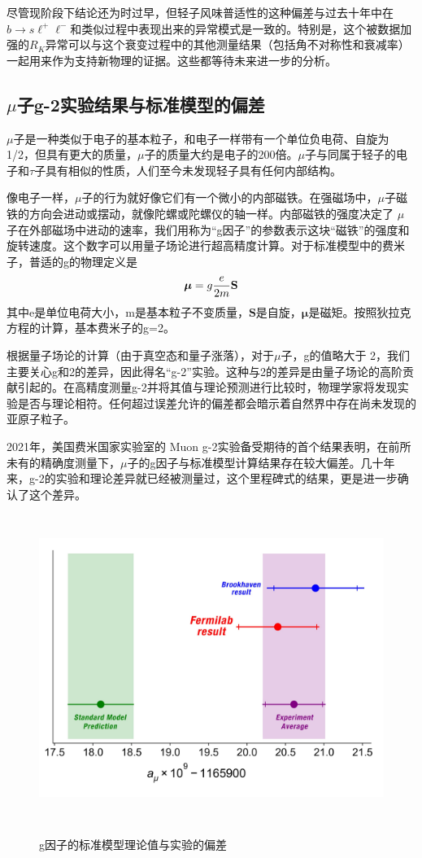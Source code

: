 尽管现阶段下结论还为时过早，但轻子风味普适性的这种偏差与过去十年中在$b\to s\ell^+\ell^-$和类似过程中表现出来的异常模式是一致的。特别是，这个被数据加强的$R_K$异常可以与这个衰变过程中的其他测量结果（包括角不对称性和衰减率）一起用来作为支持新物理的证据。这些都等待未来进一步的分析。

\subsection{$\mu$子g-2实验结果与标准模型的偏差}
$\mu$子是一种类似于电子的基本粒子，和电子一样带有一个单位负电荷、自旋为1/2，但具有更大的质量，$\mu$子的质量大约是电子的200倍。$\mu$子与同属于轻子的电子和$\tau$子具有相似的性质，人们至今未发现轻子具有任何内部结构。

像电子一样，$\mu$子的行为就好像它们有一个微小的内部磁铁。在强磁场中，$\mu$子磁铁的方向会进动或摆动，就像陀螺或陀螺仪的轴一样。内部磁铁的强度决定了 $\mu$ 子在外部磁场中进动的速率，我们用称为“g因子”的参数表示这块“磁铁”的强度和旋转速度。这个数字可以用量子场论进行超高精度计算。对于标准模型中的费米子，普适的g的物理定义是
\begin{equation}
    \boldsymbol \mu = g {e \over 2m} \mathbf S 
\end{equation}
其中e是单位电荷大小，m是基本粒子不变质量，$\mathbf S $是自旋，$\boldsymbol\mu$是磁矩。按照狄拉克方程的计算，基本费米子的g=2。

根据量子场论的计算（由于真空态和量子涨落），对于$\mu$子，g的值略大于 2，我们主要关心g和2的差异，因此得名“g-2”实验。这种与2的差异是由量子场论的高阶贡献引起的。在高精度测量g-2并将其值与理论预测进行比较时，物理学家将发现实验是否与理论相符。任何超过误差允许的偏差都会暗示着自然界中存在尚未发现的亚原子粒子。

2021年，美国费米国家实验室的 Muon g-2实验备受期待的首个结果表明\cite{muong-2}，在前所未有的精确度测量下，$\mu$子的g因子与标准模型计算结果存在较大偏差。几十年来，g-2的实验和理论差异就已经被测量过，这个里程碑式的结果，更是进一步确认了这个差异。
\begin{figure}[H]
 \centering
 \caption{g因子的标准模型理论值与实验的偏差\cite{muong-2_fig}}
 \includegraphics[height=10cm, width=12cm]{pictures/Muon-g-2-results-plot.jpeg}
 \label{fig:1.3}
\end{figure}

